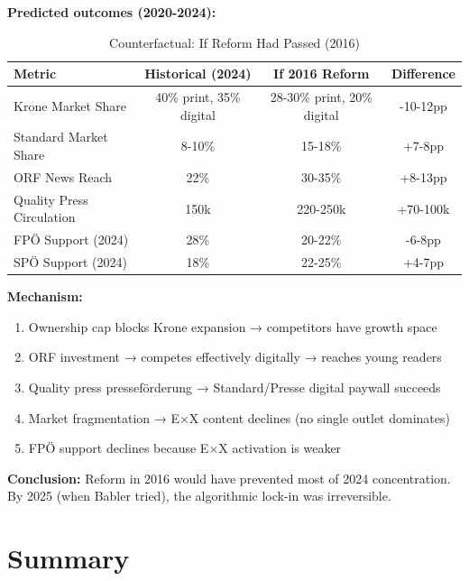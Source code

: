 {\textbf{Predicted outcomes (2020-2024):}

\begin{table}[h]
\centering
\caption{Counterfactual: If Reform Had Passed (2016)}
\label{tab:bg-counterfactual}
\begin{tabular}{|l|c|c|c|}
\hline
\textbf{Metric} & \textbf{Historical (2024)} & \textbf{If 2016 Reform} & \textbf{Difference} \\
\hline
Krone Market Share & 40\% print, 35\% digital & 28-30\% print, 20\% digital & -10-12pp \\
Standard Market Share & 8-10\% & 15-18\% & +7-8pp \\
ORF News Reach & 22\% & 30-35\% & +8-13pp \\
Quality Press Circulation & 150k & 220-250k & +70-100k \\
FPÖ Support (2024) & 28\% & 20-22\% & -6-8pp \\
SPÖ Support (2024) & 18\% & 22-25\% & +4-7pp \\
\hline
\end{tabular}
\end{table}

\textbf{Mechanism:}
\begin{enumerate}
\item Ownership cap blocks Krone expansion → competitors have growth space
\item ORF investment → competes effectively digitally → reaches young readers
\item Quality press presseförderung → Standard/Presse digital paywall succeeds
\item Market fragmentation → E×X content declines (no single outlet dominates)
\item FPÖ support declines because E×X activation is weaker
\end{enumerate}

\textbf{Conclusion:} Reform in 2016 would have prevented most of 2024 concentration.
By 2025 (when Babler tried), the algorithmic lock-in was irreversible.



\section*{Summary}

}
